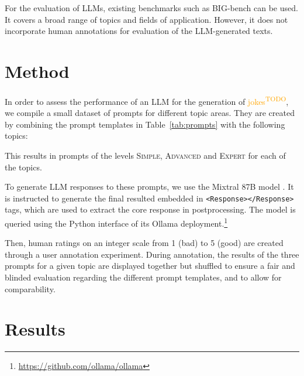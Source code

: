 \documentclass[11pt]{article}
\newcommand{\todo}[1]{\textcolor{orange}{#1\textsuperscript{\footnotesize TODO}}}
\begin{document}
For the evaluation of LLMs, existing benchmarks such as BIG-bench \cite{srivastava2023} can be used. It covers a broad range of topics and fields of application. However, it does not incorporate human annotations for evaluation of the LLM-generated texts.

\section{Method}

In order to assess the performance of an LLM for the generation of \todo{jokes}, we compile a small dataset of prompts for different topic areas. They are created by combining the prompt templates in Table~\ref{tab:prompts} with the following topics:




This results in prompts of the levels \textsc{Simple}, \textsc{Advanced} and \textsc{Expert} for each of the topics.

To generate LLM responses to these prompts, we use the Mixtral 8\texttimes 7B model \cite{jiang2024}. It is instructed to generate the final resulted embedded in \texttt{\textless{}Response\textgreater{}\textless{}/Response\textgreater{}} tags, which are used to extract the core response in postprocessing. The model is queried using the Python interface of its Ollama deployment.\footnote{\url{https://github.com/ollama/ollama}}

Then, human ratings on an integer scale from 1 (bad) to 5 (good) are created through a user annotation experiment. During annotation, the results of the three prompts for a given topic are displayed together but shuffled to ensure a fair and blinded evaluation regarding the different prompt templates, and to allow for comparability.


\section{Results}
\end{document}
